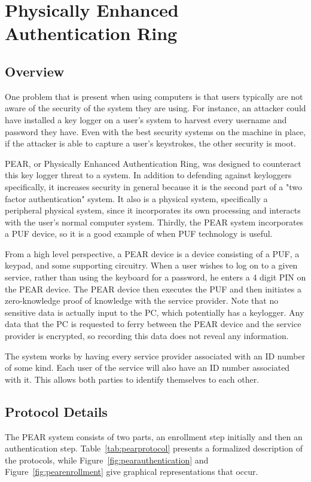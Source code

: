 
\chapter{Physically Enhanced Authentication Ring}
\label{chapter:pear}

\section{Overview}
One problem that is present when using computers is that users typically are not aware of the security of the system
they are using. For instance, an attacker could have installed a key logger on a user's system to harvest every username
and password they have. Even with the best security systems on the machine in place, if the attacker is able to capture
a user's keystrokes, the other security is moot. 

PEAR, or Physically Enhanced Authentication Ring, was designed to counteract this key logger threat to a system. In addition
to defending against keyloggers specifically, it increases security in general because it is the second part of a "two factor
authentication" system. It also is a physical system, specifically a peripheral physical system, since it incorporates its
own processing and interacts with the user's normal computer system. Thirdly, the PEAR system incorporates a PUF device,
so it is a good example of when PUF technology is useful.

From a high level perspective, a PEAR device is a device consisting of a PUF, a keypad, and some supporting circuitry. When
a user wishes to log on to a given service, rather than using the keyboard for a password, he enters a 4 digit PIN on the PEAR
device. The PEAR device then executes the PUF and then initiates a zero-knowledge proof of knowledge with the service
provider. Note that no sensitive data is actually input to the PC, which potentially has a keylogger. Any data that the PC
is requested to ferry between the PEAR device and the service provider is encrypted, so recording this data does not reveal
any information.

The system works by having every service provider associated with an ID number of some kind. Each user of the service will
also have an ID number associated with it. This allows both parties to identify themselves to each other.

\section{Protocol Details}
The PEAR system consists of two parts, an enrollment step initially and then an authentication step.
Table~\ref{tab:pearprotocol} presents a formalized description of the protocols, while Figure~\ref{fig:pearauthentication}
and Figure~\ref{fig:pearenrollment} give graphical representations that occur.

